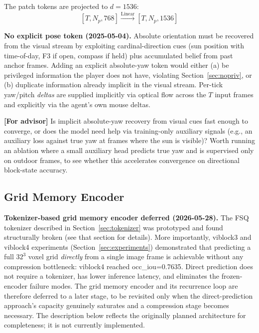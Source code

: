 \documentclass[11pt,a4paper]{article}
\begin{document}
The patch tokens are projected to $d = 1536$:
\[
[T, N_p, 768] \xrightarrow{\text{Linear}} [T, N_p, 1536]
\]

\begin{designdecision}
\textbf{No explicit pose token (2025-05-04).} Absolute orientation must be recovered from the visual stream by exploiting cardinal-direction cues (sun position with time-of-day, F3 if open, compass if held) plus accumulated belief from past anchor frames. Adding an explicit absolute-yaw token would either (a) be privileged information the player does not have, violating Section~\ref{sec:nopriv}, or (b) duplicate information already implicit in the visual stream. Per-tick yaw/pitch \textit{deltas} are supplied implicitly via optical flow across the $T$ input frames and explicitly via the agent's own mouse deltas.
\end{designdecision}

\begin{openquestion}
\textbf{[For advisor]} Is implicit absolute-yaw recovery from visual cues fast enough to converge, or does the model need help via training-only auxiliary signals (e.g., an auxiliary loss against true yaw at frames where the sun is visible)? Worth running an ablation where a small auxiliary head predicts true yaw and is supervised only on outdoor frames, to see whether this accelerates convergence on directional block-state accuracy.
\end{openquestion}

\subsection{Grid Memory Encoder}

\begin{designdecision}
\textbf{Tokenizer-based grid memory encoder deferred (2026-05-28).} The FSQ tokenizer described in Section~\ref{sec:tokenizer} was prototyped and found structurally broken (see that section for details). More importantly, viblock3 and viblock4 experiments (Section~\ref{sec:experiments}) demonstrated that predicting a full $32^3$ voxel grid \emph{directly} from a single image frame is achievable without any compression bottleneck: viblock4 reached occ\_iou=0.7635. Direct prediction does not require a tokenizer, has lower inference latency, and eliminates the frozen-encoder failure modes. The grid memory encoder and its recurrence loop are therefore deferred to a later stage, to be revisited only when the direct-prediction approach's capacity genuinely saturates and a compression stage becomes necessary. The description below reflects the originally planned architecture for completeness; it is not currently implemented.
\end{designdecision}
\end{document}
